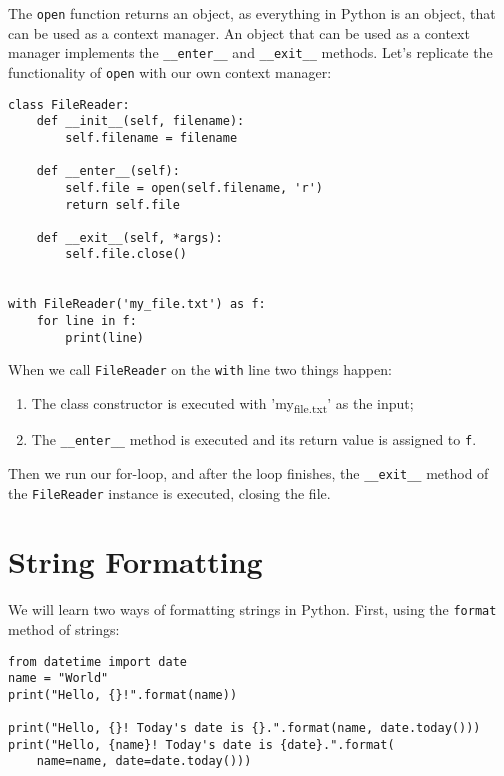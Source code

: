 \documentclass[12pt, a4paper]{article}
\begin{document}
The \texttt{open} function returns an object, as everything in Python is an object, that can be used as a context manager.
An object that can be used as a context manager implements the \texttt{\_\_enter\_\_} and \texttt{\_\_exit\_\_} methods.
Let's replicate the functionality of \texttt{open} with our own context manager:
\lstset{language=jupyter-python,label= ,caption= ,captionpos=b,numbers=none}
\begin{lstlisting}
class FileReader:
    def __init__(self, filename):
        self.filename = filename

    def __enter__(self):
        self.file = open(self.filename, 'r')
        return self.file

    def __exit__(self, *args):
        self.file.close()


with FileReader('my_file.txt') as f:
    for line in f:
        print(line)
\end{lstlisting}
When we call \texttt{FileReader} on the \texttt{with} line two things happen:
\begin{enumerate}
\item The class constructor is executed with 'my\textsubscript{file.txt}' as the input;
\item The \texttt{\_\_enter\_\_} method is executed and its return value is assigned to \texttt{f}.
\end{enumerate}
Then we run our for-loop, and after the loop finishes, the \texttt{\_\_exit\_\_} method of the \texttt{FileReader} instance is executed, closing the file.
\section{String Formatting}
\label{sec:orgf863547}
We will learn two ways of formatting strings in Python.
First, using the \texttt{format} method of strings:
\lstset{language=jupyter-python,label= ,caption= ,captionpos=b,numbers=none}
\begin{lstlisting}
from datetime import date
name = "World"
print("Hello, {}!".format(name))

print("Hello, {}! Today's date is {}.".format(name, date.today()))
print("Hello, {name}! Today's date is {date}.".format(
    name=name, date=date.today()))
\end{lstlisting}
\end{document}
